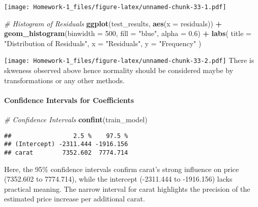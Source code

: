 \documentclass[
]{article}
\newenvironment{Shaded}{\begin{snugshade}}{\end{snugshade}}
\newcommand{\AttributeTok}[1]{\textcolor[rgb]{0.13,0.29,0.53}{#1}}
\newcommand{\CommentTok}[1]{\textcolor[rgb]{0.56,0.35,0.01}{\textit{#1}}}
\newcommand{\DecValTok}[1]{\textcolor[rgb]{0.00,0.00,0.81}{#1}}
\newcommand{\FloatTok}[1]{\textcolor[rgb]{0.00,0.00,0.81}{#1}}
\newcommand{\FunctionTok}[1]{\textcolor[rgb]{0.13,0.29,0.53}{\textbf{#1}}}
\newcommand{\NormalTok}[1]{#1}
\newcommand{\SpecialCharTok}[1]{\textcolor[rgb]{0.81,0.36,0.00}{\textbf{#1}}}
\newcommand{\StringTok}[1]{\textcolor[rgb]{0.31,0.60,0.02}{#1}}
\begin{document}
\texttt{[image: Homework-1\_files/figure-latex/unnamed-chunk-33-1.pdf]}

\begin{Shaded}
\begin{Highlighting}[]
\CommentTok{\# Histogram of Residuals}
\FunctionTok{ggplot}\NormalTok{(test\_results, }\FunctionTok{aes}\NormalTok{(}\AttributeTok{x =}\NormalTok{ residuals)) }\SpecialCharTok{+}
  \FunctionTok{geom\_histogram}\NormalTok{(}\AttributeTok{binwidth =} \DecValTok{500}\NormalTok{, }\AttributeTok{fill =} \StringTok{"blue"}\NormalTok{, }\AttributeTok{alpha =} \FloatTok{0.6}\NormalTok{) }\SpecialCharTok{+}
  \FunctionTok{labs}\NormalTok{(}
    \AttributeTok{title =} \StringTok{"Distribution of Residuals"}\NormalTok{,}
    \AttributeTok{x =} \StringTok{"Residuals"}\NormalTok{,}
    \AttributeTok{y =} \StringTok{"Frequency"}
\NormalTok{  )}
\end{Highlighting}
\end{Shaded}

\texttt{[image: Homework-1\_files/figure-latex/unnamed-chunk-33-2.pdf]}
There is skweness observed above hence normality should be considered
maybe by transformations or any other methods.

\paragraph{Confidence Intervals for
Coefficients}\label{confidence-intervals-for-coefficients}

\begin{Shaded}
\begin{Highlighting}[]
\CommentTok{\# Confidence Intervals}
\FunctionTok{confint}\NormalTok{(train\_model)}
\end{Highlighting}
\end{Shaded}

\begin{verbatim}
##                 2.5 %    97.5 %
## (Intercept) -2311.444 -1916.156
## carat        7352.602  7774.714
\end{verbatim}

Here, the 95\% confidence intervals confirm carat's strong influence on
price (7352.602 to 7774.714), while the intercept (-2311.444 to
-1916.156) lacks practical meaning. The narrow interval for carat
highlights the precision of the estimated price increase per additional
carat.
\end{document}
